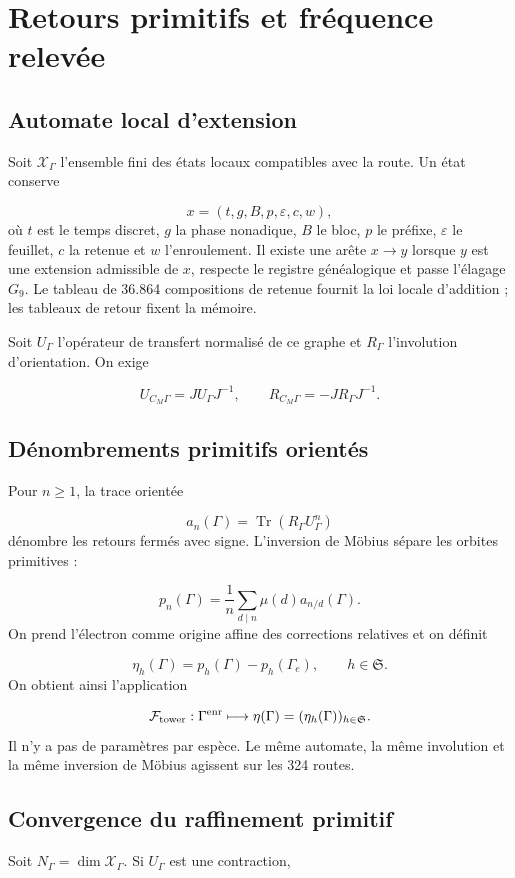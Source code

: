 \section{Retours primitifs et fréquence relevée}
\subsection{Automate local d’extension}
Soit \(\mathscr X_\Gamma\) l’ensemble fini des états locaux compatibles avec la route. Un état conserve

\[
 x=(t,g,B,p,\varepsilon,c,w),
\]
où \(t\) est le temps discret, \(g\) la phase nonadique, \(B\) le bloc, \(p\) le préfixe, \(\varepsilon\) le feuillet, \(c\) la retenue et \(w\) l’enroulement. Il existe une arête \(x\to y\) lorsque \(y\) est une extension admissible de \(x\), respecte le registre généalogique et passe l’élagage \(G_9\). Le tableau de 36.864 compositions de retenue fournit la loi locale d’addition ; les tableaux de retour fixent la mémoire.

Soit \(U_\Gamma\) l’opérateur de transfert normalisé de ce graphe et \(R_\Gamma\) l’involution d’orientation. On exige

\[
 U_{C_M\Gamma}=J U_\Gamma J^{-1},\qquad
 R_{C_M\Gamma}=-J R_\Gamma J^{-1}.
\]
\subsection{Dénombrements primitifs orientés}
Pour \(n\ge1\), la trace orientée

\[
 a_n(\Gamma)=\operatorname{Tr}(R_\Gamma U_\Gamma^n)
\]
dénombre les retours fermés avec signe. L’inversion de Möbius sépare les orbites primitives :

\[
 p_n(\Gamma)
 =\frac1n\sum_{d\mid n}\mu(d)a_{n/d}(\Gamma).
\]
On prend l’électron comme origine affine des corrections relatives et on définit

\[
 \boxed{
 \eta_h(\Gamma)=p_h(\Gamma)-p_h(\Gamma_e),
 \qquad h\in\mathfrak S.}
\]
On obtient ainsi l’application

\[
 \mathcal F_{\rm tower}:
 \Gamma^{\rm enr}\longmapsto
 \eta(\Gamma)=(\eta_h(\Gamma))_{h\in\mathfrak S}.
\]
Il n’y a pas de paramètres par espèce. Le même automate, la même involution et la même inversion de Möbius agissent sur les 324 routes.

\subsection{Convergence du raffinement primitif}
Soit \(N_\Gamma=\dim\mathscr X_\Gamma\). Si \(U_\Gamma\) est une contraction,


